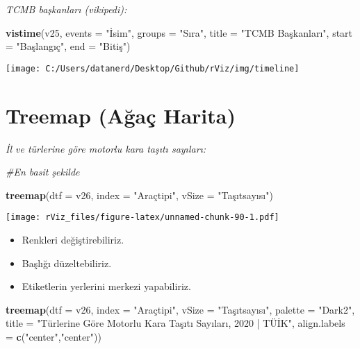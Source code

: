 \documentclass[
]{book}
\newenvironment{Shaded}{\begin{snugshade}}{\end{snugshade}}
\newcommand{\CommentTok}[1]{\textcolor[rgb]{0.56,0.35,0.01}{\textit{#1}}}
\newcommand{\DataTypeTok}[1]{\textcolor[rgb]{0.13,0.29,0.53}{#1}}
\newcommand{\KeywordTok}[1]{\textcolor[rgb]{0.13,0.29,0.53}{\textbf{#1}}}
\newcommand{\NormalTok}[1]{#1}
\newcommand{\StringTok}[1]{\textcolor[rgb]{0.31,0.60,0.02}{#1}}
\begin{document}
\emph{TCMB başkanları (vikipedi):}

\begin{Shaded}
\begin{Highlighting}[]
\KeywordTok{vistime}\NormalTok{(v25, }\DataTypeTok{events =} \StringTok{"İsim"}\NormalTok{, }\DataTypeTok{groups =} \StringTok{"Sıra"}\NormalTok{, }\DataTypeTok{title =} \StringTok{"TCMB Başkanları"}\NormalTok{, }\DataTypeTok{start =} \StringTok{"Başlangıç"}\NormalTok{, }\DataTypeTok{end =} \StringTok{"Bitiş"}\NormalTok{)}
\end{Highlighting}
\end{Shaded}

\texttt{[image: C:/Users/datanerd/Desktop/Github/rViz/img/timeline]}

\hypertarget{treemap-aux11fauxe7-harita}{%
\section{Treemap (Ağaç Harita)}\label{treemap-aux11fauxe7-harita}}

\emph{İl ve türlerine göre motorlu kara taşıtı sayıları:}

\begin{Shaded}
\begin{Highlighting}[]
\CommentTok{#En basit şekilde}

\KeywordTok{treemap}\NormalTok{(}\DataTypeTok{dtf =}\NormalTok{ v26,}
        \DataTypeTok{index =} \StringTok{"Araçtipi"}\NormalTok{,}
        \DataTypeTok{vSize =} \StringTok{"Taşıtsayısı"}\NormalTok{)}
\end{Highlighting}
\end{Shaded}

\texttt{[image: rViz\_files/figure-latex/unnamed-chunk-90-1.pdf]}

\begin{itemize}
\item
  Renkleri değiştirebiliriz.
\item
  Başlığı düzeltebiliriz.
\item
  Etiketlerin yerlerini merkezi yapabiliriz.
\end{itemize}

\begin{Shaded}
\begin{Highlighting}[]
\KeywordTok{treemap}\NormalTok{(}\DataTypeTok{dtf =}\NormalTok{ v26,}
        \DataTypeTok{index =} \StringTok{"Araçtipi"}\NormalTok{,}
        \DataTypeTok{vSize =} \StringTok{"Taşıtsayısı"}\NormalTok{,}
        \DataTypeTok{palette =} \StringTok{"Dark2"}\NormalTok{,}
        \DataTypeTok{title =} \StringTok{"Türlerine Göre Motorlu Kara Taşıtı Sayıları, 2020 | TÜİK"}\NormalTok{,}
        \DataTypeTok{align.labels =} \KeywordTok{c}\NormalTok{(}\StringTok{"center"}\NormalTok{,}\StringTok{"center"}\NormalTok{))}
\end{Highlighting}
\end{Shaded}
\end{document}

